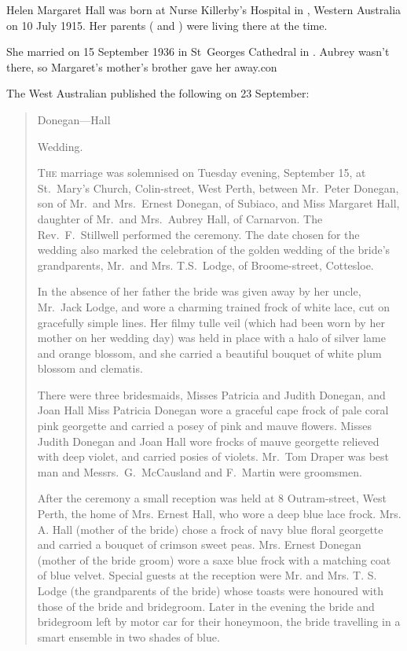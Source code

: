 
Helen Margaret Hall was born at Nurse Killerby's Hospital in , Western Australia\cite{HMHbirthNotice}
on 10 July 1915.\cite{HMHbirth}
Her parents ( and ) were living there at the time.

She married  on 15 September 1936 in St~Georges Cathedral in .\cite{MargPeterMarriage}
Aubrey wasn't there, so Margaret's mother's brother  gave her away.\cite{DoneganHallWedding1936}con

The West Australian published the following on 23 September:\cite{DoneganHallWedding1936}

\begin{quotation}
Donegan---Hall

Wedding.

\textsc{The} marriage was solemnised on Tuesday evening, September 15, at St.\ Mary's Church, Colin-street, West Perth,
between Mr.\ Peter Donegan, son of Mr.\ and Mrs.\ Ernest Donegan, of Subiaco, and Miss Margaret Hall, daughter of Mr.\
and Mrs.\ Aubrey Hall, of Carnarvon. The Rev.\ F.\ Stillwell performed the ceremony. The date chosen for the wedding
also marked the celebration of the golden wedding of the bride's grandparents, Mr.\ and Mrs. T.S.\ Lodge, of
Broome-street, Cottesloe.

In the absence of her father the bride was given away by her uncle, Mr.\ Jack Lodge, and wore a charming trained frock of
white lace, cut on gracefully simple lines. Her filmy tulle veil (which had been worn by her mother on her wedding day)
was held in place with a halo of silver lame and orange blossom, and she carried a beautiful bouquet of white plum blossom and clematis.

There were three bridesmaids, Misses Patricia and Judith Donegan, and Joan Hall Miss Patricia Donegan wore a graceful cape frock of pale coral pink
georgette and carried a posey of pink and mauve flowers. Misses Judith Donegan and Joan Hall wore frocks of mauve
georgette relieved with deep violet, and carried posies of violets.
Mr.\ Tom Draper was best man and Messrs.\ G.\ McCausland and F.\ Martin were groomsmen.

After the ceremony a small reception was held at 8 Outram-street, West Perth, the home of Mrs. Ernest Hall,
who wore a deep blue lace frock. Mrs. A. Hall (mother of the bride) chose a frock of navy blue floral georgette and carried
a bouquet of crimson sweet peas. Mrs. Ernest Donegan (mother of the bride groom) wore a saxe blue frock with a matching coat of blue velvet.
Special guests at the reception were Mr. and Mrs. T. S. Lodge (the grandparents of the bride) whose toasts were honoured
with those of the bride and bridegroom. Later in the evening the bride and bridegroom left by motor car for their honeymoon,
the bride travelling in a smart ensemble in two shades of blue.
\end{quotation}

